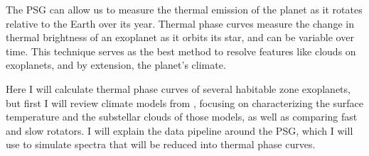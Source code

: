 The PSG can allow us to measure the
 thermal emission of the planet as it rotates relative to the Earth over its
 year. Thermal phase curves measure the change in thermal brightness of an
 exoplanet as it orbits its star, and can be variable over time. This technique
 serves as the best method to resolve features like clouds on exoplanets, and
 by extension, the planet's climate.

Here I will calculate thermal phase curves
 of several habitable zone exoplanets, but first I will review climate models
 from \citet{wolf17, wolf18}, focusing on characterizing the surface temperature
 and the substellar
 clouds of those models, as well as comparing fast and slow rotators. I
 will explain the data pipeline around the PSG, which I will use to simulate
 spectra that will be reduced into thermal phase curves.
